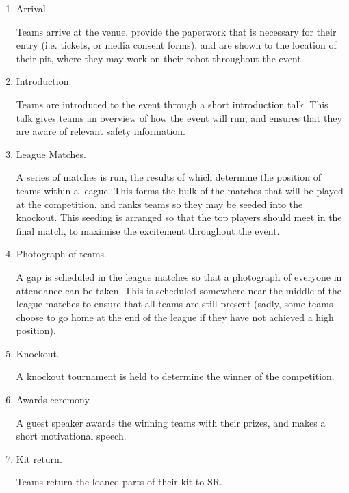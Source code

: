 \begin{enumerate}
\item Arrival.

  Teams arrive at the venue, provide the paperwork that is necessary for their entry (i.e. tickets, or media consent forms), and are shown to the location of their pit, where they may work on their robot throughout the event.

\item Introduction.

  Teams are introduced to the event through a short introduction talk.  This talk gives teams an overview of how the event will run, and ensures that they are aware of relevant safety information.

\item League Matches.

  A series of matches is run, the results of which determine the position of teams within a league.  This forms the bulk of the matches that will be played at the competition, and ranks teams so they may be seeded into the knockout.  This seeding is arranged so that the top players should meet in the final match, to maximise the excitement throughout the event.

\item Photograph of teams.

  A gap is scheduled in the league matches so that a photograph of everyone in attendance can be taken.  This is scheduled somewhere near the middle of the league matches to ensure that all teams are still present (sadly, some teams choose to go home at the end of the league if they have not achieved a high position).

\item Knockout.

  A knockout tournament is held to determine the winner of the competition.

\item Awards ceremony.

  A guest speaker awards the winning teams with their prizes, and makes a short motivational speech.

\item Kit return.

  Teams return the loaned parts of their kit to SR.
\end{enumerate}

